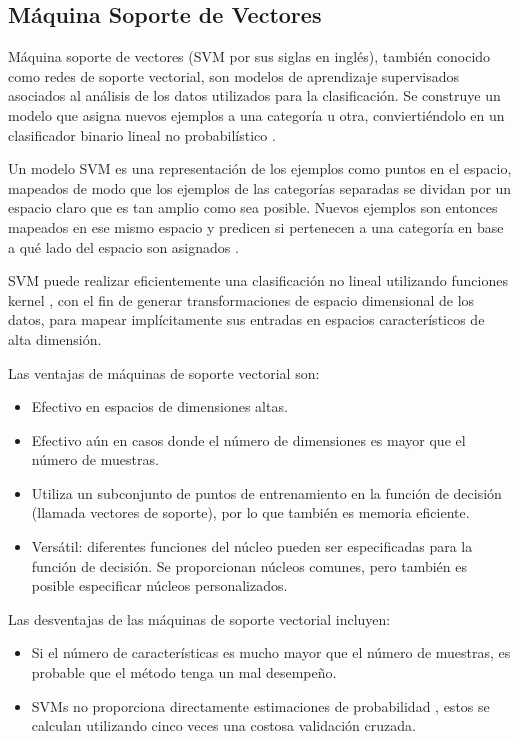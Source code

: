 \subsection{Máquina Soporte de Vectores}

Máquina soporte de vectores (SVM por sus siglas en inglés), también conocido como redes de soporte vectorial, son modelos de aprendizaje supervisados asociados al análisis de los datos utilizados para la clasificación. Se construye un modelo que asigna nuevos ejemplos a una categoría u otra, conviertiéndolo en un clasificador binario lineal no probabilístico \cite{scholkopf2001learning}. 

Un modelo SVM es una representación de los ejemplos como puntos en el espacio, mapeados de modo que los ejemplos de las categorías separadas se dividan por un espacio claro que es tan amplio como sea posible. Nuevos ejemplos son entonces mapeados en ese mismo espacio y predicen si pertenecen a una categoría en base a qué lado del espacio son asignados \cite{scholkopf2001learning}.

SVM puede realizar eficientemente una clasificación no lineal utilizando funciones kernel \cite{amari1999improving}, con el fin de generar transformaciones de espacio dimensional de los datos, para mapear implícitamente sus entradas en espacios característicos de alta dimensión.

Las ventajas de máquinas de soporte vectorial son:

\begin{itemize}
	
	\item Efectivo en espacios de dimensiones altas.
	\item Efectivo aún en casos donde el número de dimensiones es mayor que el número de
	muestras.
	\item Utiliza un subconjunto de puntos de entrenamiento en la función de decisión (llamada
	vectores de soporte), por lo que también es memoria eficiente.
	\item Versátil: diferentes funciones del núcleo pueden ser especificadas para la función de decisión.
	Se proporcionan núcleos comunes, pero también es posible especificar núcleos
	personalizados.
	
\end{itemize}

Las desventajas de las máquinas de soporte vectorial incluyen:

\begin{itemize}
	
	\item Si el número de características es mucho mayor que el número de muestras, es probable que
	el método tenga un mal desempeño.
	\item SVMs no proporciona directamente estimaciones de probabilidad \cite{wu2004probability}, estos se calculan utilizando
	cinco veces una costosa validación cruzada.
	
\end{itemize}


